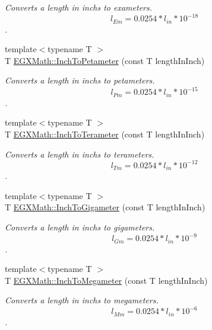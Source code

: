 \begin{DoxyCompactItemize}
\begin{DoxyCompactList}\small\item\em Converts a length in inchs to exameters. \[ l_{Em}=0.0254 * l_{in} * 10^{-18} \]. \end{DoxyCompactList}\item 
{\footnotesize template$<$typename T $>$ }\\T \mbox{\hyperlink{group___e_g_x_math-_conversions-_length_conversions-_imperial-_inch-_s_i_gae30ce4093b17aa63cc6d96a035e8dc61}{E\+G\+X\+Math\+::\+Inch\+To\+Petameter}} (const T length\+In\+Inch)
\begin{DoxyCompactList}\small\item\em Converts a length in inchs to petameters. \[ l_{Pm}=0.0254 * l_{in} * 10^{-15} \]. \end{DoxyCompactList}\item 
{\footnotesize template$<$typename T $>$ }\\T \mbox{\hyperlink{group___e_g_x_math-_conversions-_length_conversions-_imperial-_inch-_s_i_ga371a80e6577f6c2ba9101b383b910fad}{E\+G\+X\+Math\+::\+Inch\+To\+Terameter}} (const T length\+In\+Inch)
\begin{DoxyCompactList}\small\item\em Converts a length in inchs to terameters. \[ l_{Tm}=0.0254 * l_{in} * 10^{-12} \]. \end{DoxyCompactList}\item 
{\footnotesize template$<$typename T $>$ }\\T \mbox{\hyperlink{group___e_g_x_math-_conversions-_length_conversions-_imperial-_inch-_s_i_gaf273646afbc5959590e89febab1a04ec}{E\+G\+X\+Math\+::\+Inch\+To\+Gigameter}} (const T length\+In\+Inch)
\begin{DoxyCompactList}\small\item\em Converts a length in inchs to gigameters. \[ l_{Gm}=0.0254 * l_{in} * 10^{-9} \]. \end{DoxyCompactList}\item 
{\footnotesize template$<$typename T $>$ }\\T \mbox{\hyperlink{group___e_g_x_math-_conversions-_length_conversions-_imperial-_inch-_s_i_ga338a079a2861293f873274e82d140e14}{E\+G\+X\+Math\+::\+Inch\+To\+Megameter}} (const T length\+In\+Inch)
\begin{DoxyCompactList}\small\item\em Converts a length in inchs to megameters. \[ l_{Mm}=0.0254 * l_{in} * 10^{-6} \]. \end{DoxyCompactList}\item 

\end{DoxyCompactItemize}
